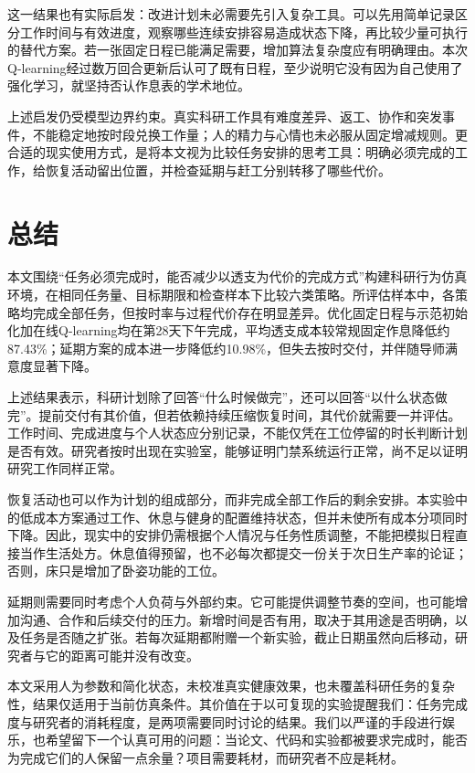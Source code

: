 \documentclass[journal]{IEEEtran}
\begin{document}
这一结果也有实际启发：改进计划未必需要先引入复杂工具。可以先用简单记录区分工作时间与有效进度，观察哪些连续安排容易造成状态下降，再比较少量可执行的替代方案。若一张固定日程已能满足需要，增加算法复杂度应有明确理由。本次Q-learning经过数万回合更新后认可了既有日程，至少说明它没有因为自己使用了强化学习，就坚持否认作息表的学术地位。

上述启发仍受模型边界约束。真实科研工作具有难度差异、返工、协作和突发事件，不能稳定地按时段兑换工作量；人的精力与心情也未必服从固定增减规则。更合适的现实使用方式，是将本文视为比较任务安排的思考工具：明确必须完成的工作，给恢复活动留出位置，并检查延期与赶工分别转移了哪些代价。

\section{总结}

本文围绕“任务必须完成时，能否减少以透支为代价的完成方式”构建科研行为仿真环境，在相同任务量、目标期限和检查样本下比较六类策略。所评估样本中，各策略均完成全部任务，但按时率与过程代价存在明显差异。优化固定日程与示范初始化加在线Q-learning均在第28天下午完成，平均透支成本较常规固定作息降低约87.43\%；延期方案的成本进一步降低约10.98\%，但失去按时交付，并伴随导师满意度显著下降。

上述结果表示，科研计划除了回答“什么时候做完”，还可以回答“以什么状态做完”。提前交付有其价值，但若依赖持续压缩恢复时间，其代价就需要一并评估。工作时间、完成进度与个人状态应分别记录，不能仅凭在工位停留的时长判断计划是否有效。研究者按时出现在实验室，能够证明门禁系统运行正常，尚不足以证明研究工作同样正常。

恢复活动也可以作为计划的组成部分，而非完成全部工作后的剩余安排。本实验中的低成本方案通过工作、休息与健身的配置维持状态，但并未使所有成本分项同时下降。因此，现实中的安排仍需根据个人情况与任务性质调整，不能把模拟日程直接当作生活处方。休息值得预留，也不必每次都提交一份关于次日生产率的论证；否则，床只是增加了卧姿功能的工位。

延期则需要同时考虑个人负荷与外部约束。它可能提供调整节奏的空间，也可能增加沟通、合作和后续交付的压力。新增时间是否有用，取决于其用途是否明确，以及任务是否随之扩张。若每次延期都附赠一个新实验，截止日期虽然向后移动，研究者与它的距离可能并没有改变。

本文采用人为参数和简化状态，未校准真实健康效果，也未覆盖科研任务的复杂性，结果仅适用于当前仿真条件。其价值在于以可复现的实验提醒我们：任务完成度与研究者的消耗程度，是两项需要同时讨论的结果。我们以严谨的手段进行娱乐，也希望留下一个认真可用的问题：当论文、代码和实验都被要求完成时，能否为完成它们的人保留一点余量？项目需要耗材，而研究者不应是耗材。
\end{document}
